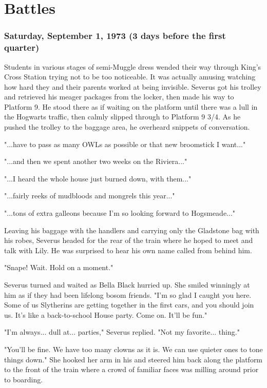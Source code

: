 
\chapter{Battles}

\subsection{Saturday, September 1, 1973 (3 days before the first quarter)}

Students in various stages of semi-Muggle dress wended their way through King's Cross Station trying not to be too noticeable. It was actually amusing watching how hard they and their parents worked at being invisible. Severus got his trolley and retrieved his meager packages from the locker, then made his way to Platform 9. He stood there as if waiting on the platform until there was a lull in the Hogwarts traffic, then calmly slipped through to Platform 9 3/4. As he pushed the trolley to the baggage area, he overheard snippets of conversation.

"...have to pass as many OWLs as possible or that new broomstick I want..."

"...and then we spent another two weeks on the Riviera..."

"...I heard the whole house just burned down, with them..."

"...fairly reeks of mudbloods and mongrels this year..."

"...tons of extra galleons because I'm so looking forward to Hogsmeade..."

Leaving his baggage with the handlers and carrying only the Gladstone bag with his robes, Severus headed for the rear of the train where he hoped to meet and talk with Lily. He was surprised to hear his own name called from behind him.

"Snape! Wait. Hold on a moment."

Severus turned and waited as Bella Black hurried up. She smiled winningly at him as if they had been lifelong bosom friends. "I'm so glad I caught you here. Some of us Slytherins are getting together in the first cars, and you should join us. It's like a back-to-school House party. Come on. It'll be fun."

"I'm always... dull at... parties," Severus replied. "Not my favorite... thing."

"You'll be fine. We have too many clowns as it is. We can use quieter ones to tone things down." She hooked her arm in his and steered him back along the platform to the front of the train where a crowd of familiar faces was milling around prior to boarding.

